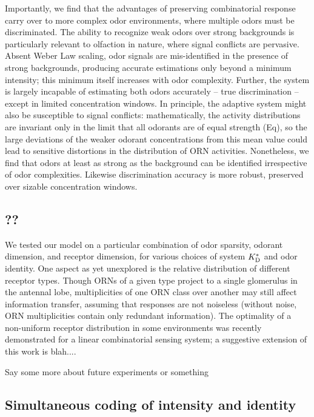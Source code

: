 Importantly, we find that the advantages of preserving combinatorial response carry over to more complex odor environments, where multiple odors must be discriminated. The ability to recognize weak odors over strong backgrounds is particularly relevant to olfaction in nature, where signal conflicts are pervasive. Absent Weber Law scaling, odor signals are mis-identified in the presence of strong backgrounds, producing accurate estimations only beyond a minimum intensity; this minimum itself increases with odor complexity. Further, the system is largely incapable of estimating both odors accurately -- true discrimination -- except in limited concentration windows. In principle, the adaptive system might also be susceptible to signal conflicts: mathematically, the activity distributions are invariant only in the limit that all odorants are of equal strength (Eq), so the large deviations of the weaker odorant concentrations from this mean value could lead to sensitive distortions in the distribution of ORN activities. Nonetheless, we find that odors at least as strong as the background can be identified irrespective of odor complexities. Likewise discrimination accuracy is more robust, preserved over sizable concentration windows. 


\subsection{??}
We tested our model on a particular combination of odor sparsity, odorant dimension, and receptor dimension, for various choices of system $K^*_{\text D}$ and odor identity. One aspect as yet unexplored is the relative distribution of different receptor types. Though ORNs of a given type project to a single glomerulus in the antennal lobe, multiplicities of one ORN class over another may still affect information transfer, assuming that responses are not noiseless (without noise, ORN multiplicities contain only redundant information). The optimality of a non-uniform receptor distribution in some environments was recently demonstrated for a linear combinatorial sensing system; a suggestive extension of this work is blah....





{\color{blue} Say some more about future experiments or something}


\subsection{Simultaneous coding of intensity and identity}

